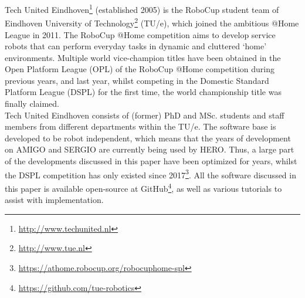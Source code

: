 Tech United Eindhoven\footnote{\url{http://www.techunited.nl}} (established 2005) is the RoboCup student team of Eindhoven University of Technology\footnote{\url{http://www.tue.nl}} (TU/e), which joined the ambitious @Home League in 2011. The RoboCup @Home competition aims to develop service robots that can perform everyday tasks in dynamic and cluttered `home' environments.
Multiple world vice-champion titles have been obtained in the Open Platform League (OPL) of the RoboCup @Home competition during previous years, and last year, whilst competing in the Domestic Standard Platform League (DSPL) for the first time, the world championship title was finally claimed. \\

\noindent Tech United Eindhoven consists of (former) PhD and MSc. students and staff members from different departments within the TU/e. The software base is developed to be robot independent, which means that the years of development on AMIGO and SERGIO are currently being used by HERO. Thus, a large part of the developments discussed in this paper have been optimized for years, whilst the DSPL competition has only existed since 2017\footnote{\url{https://athome.robocup.org/robocuphome-spl}}. All the software discussed in this paper is available open-source at GitHub\footnote{\url{https://github.com/tue-robotics}}, as well as various tutorials to assist with implementation. 


